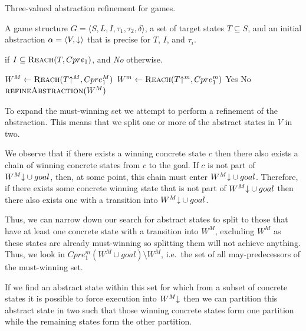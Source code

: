 \begin{algorithm}
\caption{Three-valued abstraction refinement for games.}
\label{alg:generic}

\begin{algorithmic}[1]

\Require A game structure $G = \langle S, L, I, \tau_1, \tau_2, \delta \rangle$, a set of target states $T\subseteq S$, and an initial abstraction $\alpha=\langle V, \mathord{\downarrow} \rangle$ that is precise for $T$, $I$, and $\tau_i$.

 if $I \subseteq \textsc{Reach}(T, Cpre_1)$, and {\it No} otherwise.

    \Loop
        \State $W^M \gets \textsc{Reach}(T\mathord{\uparrow^M}, Cpre_1^M)$ \label{a:generic:l:M} \label{a:generic:must}
        \State $W^m \gets \textsc{Reach}(T\mathord{\uparrow^m}, Cpre_1^m)$ \label{a:generic:l:m}
         \label{alg:tvg:tc1}
            \State\Return Yes \label{a:generic:l:yes}
         \label{alg:tvg:tc2}
            \State\Return No \label{a:generic:l:no}
        \Else       
            \State$\Call{refineAbstraction}{W^M}$
        \EndIf
    \EndLoop
\EndFunction

\end{algorithmic}
\end{algorithm}

To expand the must-winning set we attempt to perform a refinement of the abstraction. This means that we split one or more of the abstract states in $V$ in two. 

We observe that if there exists a winning concrete state $c$ then there also exists a chain of winning concrete states from $c$ to the goal. If $c$ is not part of $W^M\mathord{\downarrow} \cup goal$, then, at some point, this chain must enter $W^M\mathord{\downarrow} \cup goal$. Therefore, if there exists some concrete winning state that is not part of $W^M\mathord{\downarrow} \cup goal$ then there also exists one with a transition into $W^M\mathord{\downarrow} \cup goal$. 

Thus, we can narrow down our search for abstract states to split to those that have at least one concrete state with a transition into $W^M$, excluding $W^M$ as these states are already must-winning so splitting them will not achieve anything. Thus, we look in $Cpre_1^m(W^M \cup goal)\setminus W^M$, i.e.\ the set of all may-predecessors of the must-winning set. 

If we find an abstract state within this set for which from a subset of concrete states it is possible to force execution into $W^M\mathord{\downarrow}$ then we can partition this abstract state in two such that those winning concrete states form one partition while the remaining states form the other partition.

